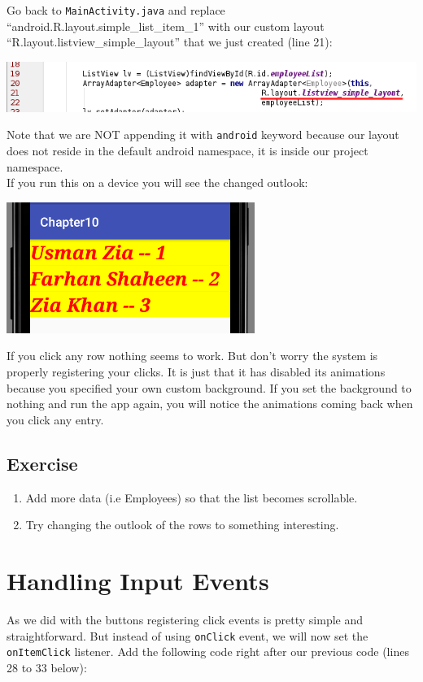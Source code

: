 Go back to \texttt{MainActivity.java} and replace ``android.R.layout.simple\_list\_item\_1'' with our custom layout ``R.layout.listview\_simple\_layout'' that we just created (line 21):

\begin{center}
	\includegraphics[scale=0.4]{chapters/ch10/images/26}
\end{center}

Note that we are NOT appending it with \texttt{android} keyword because our layout does not reside in the default android namespace, it is inside our project namespace. \\

If you run this on a device you will see the changed outlook:

\begin{center}
	\includegraphics[scale=0.4]{chapters/ch10/images/27}
\end{center}

If you click any row nothing seems to work. But don't worry the system is properly registering your clicks. It is just that it has disabled its animations because you specified your own custom background. If you set the background to nothing and run the app again, you will notice the animations coming back when you click any entry.

\subsection{Exercise}
\begin{enumerate}
	\item Add more data (i.e Employees) so that the list becomes scrollable.
	\item Try changing the outlook of the rows to something interesting.
\end{enumerate}

\section{Handling Input Events}
As we did with the buttons registering click events is pretty simple and straightforward. But instead of using \texttt{onClick} event, we will now set the \texttt{onItemClick} listener. Add the following code right after our previous code (lines 28 to 33 below):

